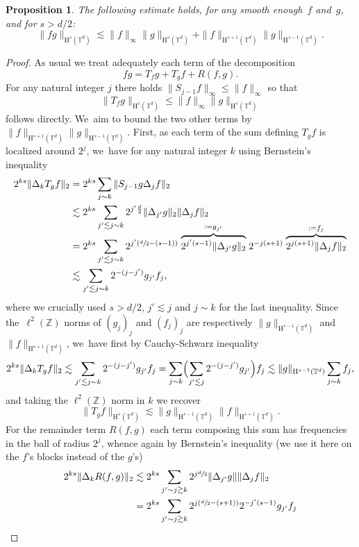 \documentclass[JEP,XML,SOM,Unicode,published]{cedram}
\newtheorem{prop}{Proposition}[section]
\theoremstyle{definition}
\newcommand\Z{\mathbb{Z}}
\newcommand\T{\mathbb{T}}
\renewcommand\H{\mathrm{H}}
\begin{document}
\begin{prop}\label{prop:rhsSobo}
The following estimate holds, for any smooth enough~$f$ and~$g$, and for $s>d/2$:
\[
\|f g\|_{\H^s(\T^d)} \lesssim \|f\|_{\infty} \|g\|_{\H^s(\T^d)}+\|f\|_{\H^{s+1}(\T^d)}\|g\|_{\H^{s-1}(\T^d)}.
\]
\end{prop}
\begin{proof}
As usual we treat adequately each term of the decomposition
\[
fg = T_f g + T_g f + R(f,g).
\]
For any natural integer $j$ there holds $\|S_{j-1} f\|_\infty\leq \|f\|_\infty$ so that
\[
\|T_f g\|_{\H^s(\T^d)} \leq \|f\|_\infty \|g\|_{\H^s(\T^d)}
\]
follows directly. We~aim to bound the two other terms by $\|f\|_{\H^{s+1}(\T^d)}\|g\|_{\H^{s-1}(\T^d)}$. First, as each term of the sum defining $T_g f$ is localized around $2^j$, we~have for any natural integer $k$ using Bernstein's inequality
\begin{align*}
2^{ks}\|\Delta_k T_g f\|_2 &= 2^{ks} \sum_{j\sim k} \|S_{j-1} g \Delta_j f\|_2\\ &\lesssim 2^{ks} \sum_{j'\lesssim j \sim k} 2^{j'\frac{d}{2}}\|\Delta_{j'} g\|_2\|\Delta_j f\|_2\\[-10pt]
&= 2^{ks} \sum_{j'\lesssim j \sim k} 2^{j'(\sfrac{d}{2}-(s-1))} \stackrel{:=g_{j'}}{\overbrace{2^{j'(s-1)}\|\Delta_{j'} g\|_2}}2^{-j(s+1)}\stackrel{:=f_j}{\overbrace{2^{j(s+1)}\|\Delta_{j} f\|_2}}\\
&\lesssim \sum_{j'\lesssim j\sim k} 2^{-(j-j')} g_{j'} f_j,
\end{align*}
where we crucially used $s>d/2$, $j'\lesssim j$ and $j\sim k$ for the last inequality. Since the~$\ell^2(\Z)$ norms of $(g_j)_j$ and $(f_j)_j$ are respectively $\|g\|_{\H^{s-1}(\T^d)}$ and $\|f\|_{\H^{s+1}(\T^d)}$, we~have first by Cauchy-Schwarz inequality
\[
2^{ks}\|\Delta_k T_g f\|_2 \lesssim \sum_{j'\lesssim j\sim k} 2^{-(j-j')} g_{j'} f_j = \sum_{j\sim k} \Bigl(\sum_{j'\lesssim j} 2^{-(j-j')} g_{j'}\Bigr) f_j \lesssim \|g\|_{\H^{s-1}(\T^d)} \sum_{j\sim k} f_j,
\]
and taking the $\ell^2(\Z)$ norm in $k$ we recover
\[
\|T_g f\|_{\H^s(\T^d)}\lesssim \|g\|_{\H^{s-1}(\T^d)}\|f\|_{\H^{s+1}(\T^d)}.
\]
For the remainder term $R(f,g)$ each term composing this sum has frequencies in the ball of radius $2^j$, whence again by Bernstein's inequality (we use it here on the $f$'s blocks instead of the $g$'s)
\begin{align*}
2^{ks}\|\Delta_k R(f,g)\|_2 &\lesssim 2^{ks} \sum_{j'\sim j \gtrsim k} 2^{j\sfrac{d}{2}} \|\Delta_{j'} g\| \|\Delta_j f\|_2\\ &= 2^{ks} \sum_{j'\sim j \gtrsim k} 2^{j(\sfrac{d}{2}-(s+1))}2^{-j'(s-1)} g_{j'} f_j\\

\end{align*}
\end{proof}
\end{document}
